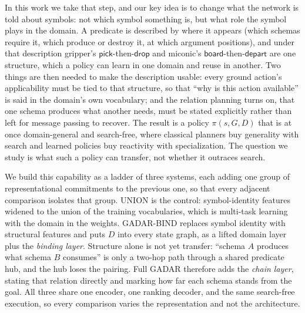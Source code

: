 \documentclass{article} %
\newcommand{\gadar}{GADAR}                 %
\newcommand{\gadarbind}{\gadar{}-BIND}     %
\newcommand{\union}{UNION}                 %
\begin{document}
In this work we take that step, and our key idea is to change what the
network is told about symbols: not which symbol something is, but what role
the symbol plays in the domain. A predicate is described by where it
appears (which schemas require it, which produce or destroy it, at which
argument positions), and under that description gripper's
$\textsf{pick}$-then-$\textsf{drop}$ and miconic's
$\textsf{board}$-then-$\textsf{depart}$ are one structure, which a policy
can learn in one domain and reuse in another. Two things are then needed to
make the description usable: every ground action's applicability must be
tied to that structure, so that ``why is this action available'' is said in
the domain's own vocabulary; and the relation planning turns on, that one
schema produces what another needs, must be stated explicitly rather than
left for message passing to recover. The result is a policy
$\pi(s, G, D)$ that is at once domain-general and search-free, where
classical planners buy generality with search and learned policies buy
reactivity with specialization. The question we study is what such a policy
can transfer, not whether it outraces search.

We build this capability as a ladder of three systems, each adding one
group of representational commitments to the previous one, so that every
adjacent comparison isolates that group. \union{} is the control: symbol-identity
features widened to the union of the training vocabularies,
which is multi-task learning with the domain in the weights. \gadarbind{}
replaces symbol identity with structural features and puts $D$ into every
state graph, as a lifted domain layer plus the \emph{binding layer}.
Structure alone is not yet transfer: ``schema $A$ produces what schema $B$
consumes'' is only a two-hop path through a shared predicate hub, and the
hub loses the pairing. Full \gadar{} therefore adds the \emph{chain
layer}, stating that relation directly and marking how far each schema
stands from the goal. All three share one encoder, one ranking decoder, and the
same search-free execution, so every comparison varies the representation
and not the architecture.
\end{document}
